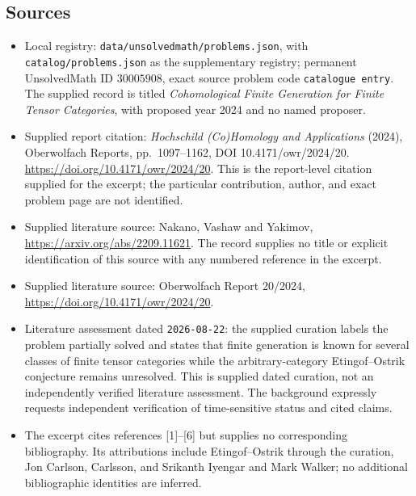\documentclass[11pt]{article}
\begin{document}
\subsection{Sources}
\begin{itemize}
\item Local registry: \texttt{data/unsolvedmath/problems.json}, with \texttt{catalog/problems.json} as the supplementary registry; permanent UnsolvedMath ID \(30005908\), exact source problem code \texttt{catalogue entry}. The supplied record is titled \emph{Cohomological Finite Generation for Finite Tensor Categories}, with proposed year 2024 and no named proposer.
\item Supplied report citation: \emph{Hochschild (Co)Homology and Applications} (2024), Oberwolfach Reports, pp.\ 1097--1162, DOI 10.4171/owr/2024/20. \url{https://doi.org/10.4171/owr/2024/20}. This is the report-level citation supplied for the excerpt; the particular contribution, author, and exact problem page are not identified.
\item Supplied literature source: Nakano, Vashaw and Yakimov, \url{https://arxiv.org/abs/2209.11621}. The record supplies no title or explicit identification of this source with any numbered reference in the excerpt.
\item Supplied literature source: Oberwolfach Report 20/2024, \url{https://doi.org/10.4171/owr/2024/20}.
\item Literature assessment dated \texttt{2026-08-22}: the supplied curation labels the problem partially solved and states that finite generation is known for several classes of finite tensor categories while the arbitrary-category Etingof--Ostrik conjecture remains unresolved. This is supplied dated curation, not an independently verified literature assessment. The background expressly requests independent verification of time-sensitive status and cited claims.
\item The excerpt cites references [1]--[6] but supplies no corresponding bibliography. Its attributions include Etingof--Ostrik through the curation, Jon Carlson, Carlsson, and Srikanth Iyengar and Mark Walker; no additional bibliographic identities are inferred.
\end{itemize}
\end{document}

